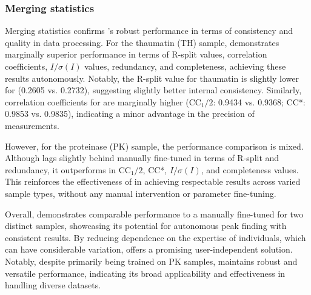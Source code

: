 \documentclass[a4paper]{article}
\begin{document}
\subsubsection{Merging statistics}

Merging statistics confirms \peaknet{}'s robust performance in terms of consistency and quality in data processing.  For the thaumatin (TH) sample, \peaknet{} demonstrates marginally superior performance in terms of R-split values, correlation coefficients, $I/\sigma(I)$ values, redundancy, and completeness, achieving these results autonomously.  Notably, the R-split value for thaumatin is slightly lower for \peaknet{} (0.2605 vs. 0.2732), suggesting slightly better internal consistency. Similarly, correlation coefficients for \peaknet{} are marginally higher (CC$_1/2$: 0.9434 vs.  0.9368; CC*: 0.9853 vs. 0.9835), indicating a minor advantage in the precision of measurements.

However, for the proteinase (PK) sample, the performance comparison is mixed.  Although \peaknet{} lags slightly behind manually fine-tuned \psocake{} in terms of R-split and redundancy, it outperforms in CC$_1/2$, CC*, $I/\sigma(I)$, and completeness values.  This reinforces the effectiveness of \peaknet{} in achieving respectable results across varied sample types, without any manual intervention or parameter fine-tuning.  

Overall, \peaknet{} demonstrates comparable performance to a manually fine-tuned \psocake{} for two distinct samples, showcasing its potential for autonomous peak finding with consistent results.  By reducing dependence on the expertise of individuals, which can have considerable variation, \peaknet{} offers a promising user-independent solution.  Notably, despite primarily being trained on PK samples, \peaknet{} maintains robust and versatile performance, indicating its broad applicability and effectiveness in handling diverse datasets.
\end{document}
